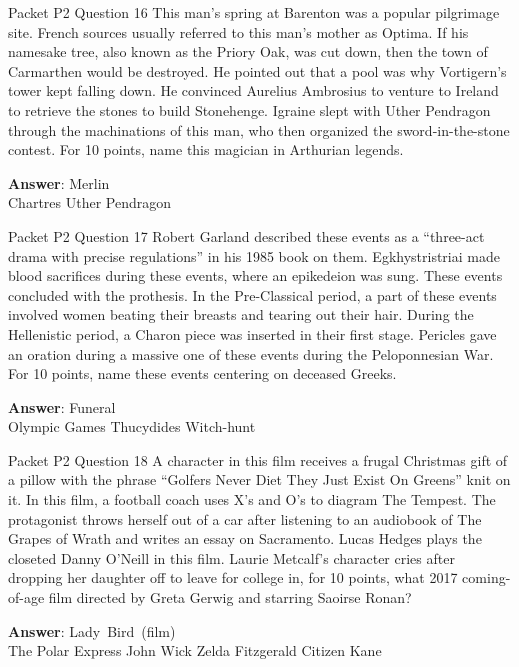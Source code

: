 \begin{frame}{Packet P2 Question 16}
This man’s spring at Barenton was a popular pilgrimage site. French sources usually   referred to this man’s mother as Optima. If his namesake tree, also known as the Priory Oak, was cut down, then the town of Carmarthen would be destroyed. He pointed out that a pool was why Vortigern’s tower kept falling     down. He convinced Aurelius Ambrosius   to venture to Ireland to retrieve the stones to build Stonehenge.   Igraine slept with Uther Pendragon through the machinations   of this man, who then organized the sword-in-the-stone contest. For 10 points, name this magician in Arthurian legends.

\textbf{Answer}: Merlin\\
 Chartres
 Uther Pendragon
\end{frame}

\begin{frame}{Packet P2 Question 17}
Robert Garland described these events as a ``three-act drama with precise regulations'' in his 1985 book on them. Egkhystristriai made blood sacrifices during these events, where an epikedeion was sung. These events concluded with the prothesis. In the Pre-Classical period, a part of these events involved women beating their breasts and tearing out their hair. During the Hellenistic   period, a Charon piece was inserted in their first stage. Pericles gave an oration during a massive one of these events during the Peloponnesian War. For 10 points, name these events centering on deceased Greeks.      

\textbf{Answer}: Funeral\\
 Olympic Games
 Thucydides
 Witch-hunt
\end{frame}

\begin{frame}{Packet P2 Question 18}
A character in this film receives a frugal Christmas gift of a   pillow with the phrase ``Golfers Never Diet They Just Exist On Greens'' knit on it. In this film, a football coach uses X's and O's to diagram The Tempest. The protagonist throws herself out of a car after listening to an audiobook of The Grapes of Wrath and writes an essay on Sacramento. Lucas Hedges plays the closeted Danny O’Neill in this film. Laurie Metcalf’s character cries after dropping her daughter off to leave for college in, for 10 points, what 2017 coming-of-age film directed by Greta Gerwig and starring Saoirse Ronan?      

\textbf{Answer}: Lady\ Bird\ (film)\\
 The Polar Express
 John Wick
 Zelda Fitzgerald
 Citizen Kane
\end{frame}

